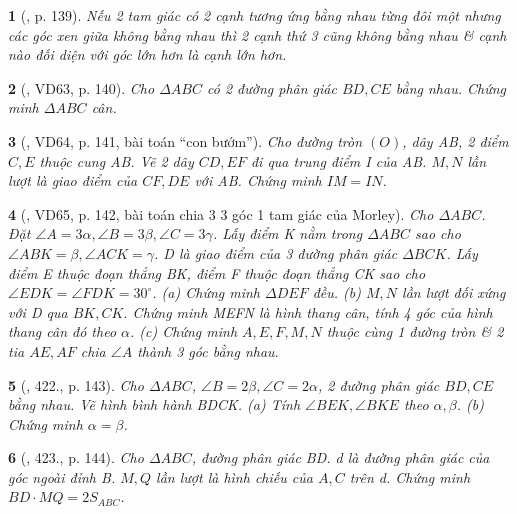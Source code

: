 \documentclass{article}
\newtheorem{baitoan}{}
\begin{document}
\begin{baitoan}[\cite{Binh_Toan_9_tap_2}, p. 139]
	Nếu 2 tam giác có 2 cạnh tương ứng bằng nhau từng đôi một nhưng các góc xen giữa không bằng nhau thì 2 cạnh thứ 3 cũng không bằng nhau \& cạnh nào đối diện với góc lớn hơn là cạnh lớn hơn.
\end{baitoan}

\begin{baitoan}[\cite{Binh_Toan_9_tap_2}, VD63, p. 140]
	Cho $\Delta ABC$ có 2 đường phân giác $BD,CE$ bằng nhau. Chứng minh $\Delta ABC$ cân.
\end{baitoan}

\begin{baitoan}[\cite{Binh_Toan_9_tap_2}, VD64, p. 141, bài toán ``con bướm'']
	Cho đường tròn $(O)$, dây AB, 2 điểm $C,E$ thuộc cung AB. Vẽ 2 dây $CD,EF$ đi qua trung điểm I của AB. $M,N$ lần lượt là giao điểm của $CF,DE$ với AB. Chứng minh $IM = IN$.
\end{baitoan}

\begin{baitoan}[\cite{Binh_Toan_9_tap_2}, VD65, p. 142, bài toán chia 3 3 góc 1 tam giác của Morley]
	Cho $\Delta ABC$. Đặt $\angle{A} = 3\alpha,\angle{B} = 3\beta,\angle{C} = 3\gamma$. Lấy điểm K nằm trong $\Delta ABC$ sao cho $\angle{ABK} = \beta,\angle{ACK} = \gamma$. D là giao điểm của 3 đường phân giác $\Delta BCK$. Lấy điểm E thuộc đoạn thẳng BK, điểm F thuộc đoạn thẳng CK sao cho $\angle{EDK} = \angle{FDK} = 30^\circ$. (a) Chứng minh $\Delta DEF$ đều. (b) $M,N$ lần lượt đối xứng với D qua $BK,CK$. Chứng minh MEFN là hình thang cân, tính 4 góc của hình thang cân đó theo $\alpha$. (c) Chứng minh $A,E,F,M,N$ thuộc cùng 1 đường tròn \& 2 tia $AE,AF$ chia $\angle{A}$ thành 3 góc bằng nhau.
\end{baitoan}

\begin{baitoan}[\cite{Binh_Toan_9_tap_2}, 422., p. 143]
	Cho $\Delta ABC$, $\angle{B} = 2\beta,\angle{C} = 2\alpha$, 2 đường phân giác $BD,CE$ bằng nhau. Vẽ hình bình hành BDCK. (a) Tính $\angle{BEK},\angle{BKE}$ theo $\alpha,\beta$. (b) Chứng minh $\alpha = \beta$.
\end{baitoan}

\begin{baitoan}[\cite{Binh_Toan_9_tap_2}, 423., p. 144]
	Cho $\Delta ABC$, đường phân giác BD. d là đường phân giác của góc ngoài đỉnh B. $M,Q$ lần lượt là hình chiếu của $A,C$ trên d. Chứng minh $BD\cdot MQ = 2S_{ABC}$.
\end{baitoan}
\end{document}

